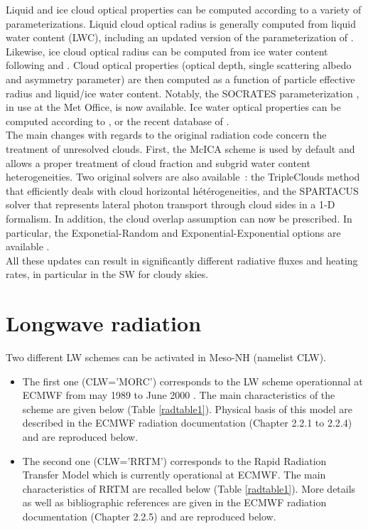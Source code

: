 Liquid and ice cloud optical properties can be computed according to a variety of parameterizations. Liquid cloud optical radius is generally computed from liquid water content (LWC), including an updated version of the parameterization of \citet{Martin1994}. Likewise, ice cloud optical radius can be computed from ice water content following \citet{Sun1999} and \citet{Sun2001}. Cloud optical properties (optical depth, single scattering albedo and asymmetry parameter) are then computed as a function of particle effective radius and liquid/ice water content. Notably, the SOCRATES parameterization \citep{Manners2015}, in use at the Met Office, is now available. Ice water optical properties can be computed according to \citet{Ebert1993}, \citet{Smith1992} or the recent database of \citet{Baran2014}.\\

The main changes with regards to the original radiation code concern the treatment of unresolved clouds. First, the McICA scheme \citep{Pincus2003} is used by default and allows a proper treatment of cloud fraction and subgrid water content heterogeneities. Two original solvers are also available : the TripleClouds method \citep{Shonk2008} that efficiently deals with cloud horizontal hétérogeneities, and the SPARTACUS solver \citep{Schaefer2016,Hogan2016} that represents lateral photon transport through cloud sides \citep{Hogan2013} in a 1-D formalism. In addition, the cloud overlap assumption can now be prescribed. In particular, the Exponetial-Random and Exponential-Exponential options are available \citep{Hogan2000}.\\

All these updates can result in significantly different radiative fluxes and heating rates, in particular in the SW for cloudy skies.

\section{Longwave radiation}

Two different LW schemes can be activated in Meso-NH (namelist CLW).

\begin{itemize}

 \item The first one (CLW='MORC') corresponds to the LW scheme operationnal at ECMWF from may 1989
to June 2000 \citep{Morcrette1991,Gregory2000}. The main characteristics of the scheme are given
below (Table \ref{radtable1}). Physical basis of this model are described in the ECMWF radiation documentation (Chapter 2.2.1 to 2.2.4) and are reproduced below.


 \item  The second one (CLW='RRTM') corresponds to the Rapid Radiation Transfer Model which is currently operational at ECMWF. The main characteristics of RRTM are recalled below (Table \ref{radtable1}). More details as well as bibliographic references are given in the ECMWF radiation documentation (Chapter 2.2.5) and are reproduced below.

\end{itemize}

